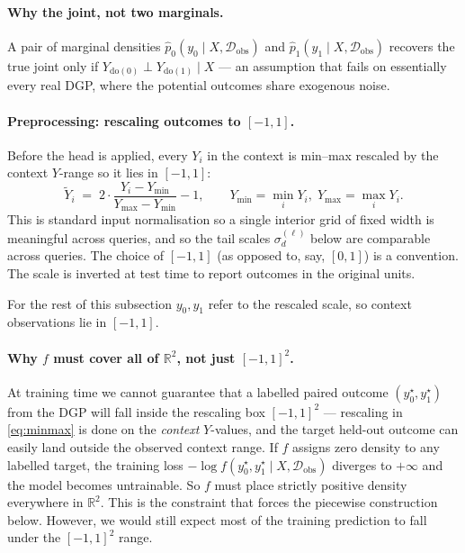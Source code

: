 \documentclass[11pt]{article}
\theoremstyle{plain}
\theoremstyle{definition}
\theoremstyle{remark}
\begin{document}
\paragraph{Why the joint, not two marginals.}
A pair of marginal densities
$\hat p_0(y_0 \mid X, \mathcal{D}_{\mathrm{obs}})$ and
$\hat p_1(y_1 \mid X, \mathcal{D}_{\mathrm{obs}})$
recovers the true joint only if $Y_{\mathrm{do}(0)} \perp Y_{\mathrm{do}(1)} \mid X$
--- an assumption that fails on essentially every real DGP, where the
potential outcomes share exogenous noise.

\paragraph{Preprocessing: rescaling outcomes to $[-1, 1]$.}
Before the head is applied, every $Y_i$ in the context is min--max
rescaled by the context $Y$-range so it lies in $[-1, 1]$:
\begin{equation}
  \tilde{Y}_i \;=\; 2 \cdot \frac{Y_i - Y_{\min}}{Y_{\max} - Y_{\min}} - 1,
  \qquad
  Y_{\min} = \min_i Y_i,\; Y_{\max} = \max_i Y_i.
  \label{eq:minmax}
\end{equation}
This is standard input normalisation so a single interior grid of fixed width is meaningful across queries, and so the tail scales
$\sigma_d^{(\ell)}$ below are comparable across queries. The choice of
$[-1, 1]$ (as opposed to, say, $[0, 1]$) is a convention. The scale is inverted at test time to report outcomes in the
original units.

For the rest of this subsection $y_0, y_1$ refer to the rescaled scale,
so context observations lie in $[-1, 1]$.

\paragraph{Why $f$ must cover all of $\mathbb{R}^2$, not just $[-1, 1]^2$.}
At training time we cannot guarantee that a labelled paired outcome
$(y_0^\star, y_1^\star)$ from the DGP will fall inside the rescaling
box $[-1, 1]^2$ --- rescaling in \eqref{eq:minmax} is done on the
\emph{context} $Y$-values, and the target held-out outcome can easily
land outside the observed context range. If $f$ assigns zero density
to any labelled target, the training loss
$-\log f(y_0^\star, y_1^\star \mid X, \mathcal{D}_{\mathrm{obs}})$
diverges to $+\infty$ and the model becomes untrainable. So $f$ must
place strictly positive density everywhere in $\mathbb{R}^2$. This is
the constraint that forces the piecewise construction below. However, we would still expect most of the training prediction to fall under the $[-1, 1]^2$ range.
\end{document}
